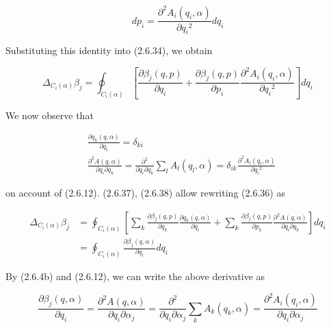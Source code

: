 \documentclass{article}
\begin{document}
\begin{equation*}
d p_{i}=\frac{\partial^{2} A_{i}\left(q_{i}, \alpha\right)}{\partial q_{i}{ }^{2}} d q_{i} \tag{2.6.35}
\end{equation*}
 

Substituting this identity into (2.6.34), we obtain
 
\begin{equation*}
\Delta_{C_{i}(\alpha)} \beta_{j}=\oint_{C_{i}(\alpha)}\left[\frac{\partial \beta_{j}(q, p)}{\partial q_{i}}+\frac{\partial \beta_{j}(q, p)}{\partial p_{i}} \frac{\partial^{2} A_{i}\left(q_{i}, \alpha\right)}{\partial q_{i}{ }^{2}}\right] d q_{i} \tag{2.6.36}
\end{equation*}
 

We now observe that
 
\begin{align*}
& \frac{\partial q_{k}(q, \alpha)}{\partial q_{i}}=\delta_{k i}  \tag{2.6.37}\\
& \frac{\partial^{2} A(q, \alpha)}{\partial q_{i} \partial q_{k}}=\frac{\partial^{2}}{\partial q_{i} \partial q_{k}} \sum_{l} A_{l}\left(q_{l}, \alpha\right)=\delta_{i k} \frac{\partial^{2} A_{i}\left(q_{i}, \alpha\right)}{\partial q_{i}{ }^{2}} \tag{2.6.38}
\end{align*}
 
on account of (2.6.12). (2.6.37), (2.6.38) allow rewriting (2.6.36) as
 
\begin{align*}
\Delta_{C_{i}(\alpha)} \beta_{j} & =\oint_{C_{i}(\alpha)}\left[\sum_{k} \frac{\partial \beta_{j}(q, p)}{\partial q_{k}} \frac{\partial q_{k}(q, \alpha)}{\partial q_{i}}+\sum_{k} \frac{\partial \beta_{j}(q, p)}{\partial p_{k}} \frac{\partial^{2} A(q, \alpha)}{\partial q_{i} \partial q_{k}}\right] d q_{i}  \tag{2.6.39}\\
& =\oint_{C_{i}(\alpha)} \frac{\partial \beta_{j}(q, \alpha)}{\partial q_{i}} d q_{i}
\end{align*}
 

By (2.6.4b) and (2.6.12), we can write the above derivative as
 
\begin{equation*}
\frac{\partial \beta_{j}(q, \alpha)}{\partial q_{i}}=\frac{\partial^{2} A(q, \alpha)}{\partial q_{i} \partial \alpha_{j}}=\frac{\partial^{2}}{\partial q_{i} \partial \alpha_{j}} \sum_{k} A_{k}\left(q_{k}, \alpha\right)=\frac{\partial^{2} A_{i}\left(q_{i}, \alpha\right)}{\partial q_{i} \partial \alpha_{j}} \tag{2.6.40}
\end{equation*}
 
\end{document}
